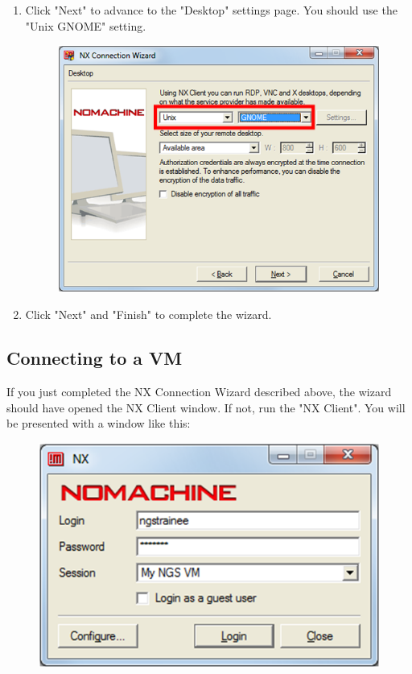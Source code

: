 \begin{enumerate}
\begin{description}
\begin{figure}[H]
    \label{fig:nx_session_configuration}
  \end{figure}
  \end{description}
  \item Click "Next" to advance to the "Desktop" settings page. You should use the
  "Unix GNOME" setting.
  \begin{figure}[H]
    \centering
    \includegraphics[scale=0.5]{post-workshop/nx_client/desktop_type.png}
    \label{fig:nx_desktop_type}
  \end{figure}
  \item Click "Next" and "Finish" to complete the wizard.
\end{enumerate}

\subsection{Connecting to a VM}
If you just completed the NX Connection Wizard described above, the wizard
should have opened the NX Client window. If not, run the "NX Client". You will
be presented with a window like this:
\begin{figure}[H]
  \centering
  \includegraphics[scale=0.5]{post-workshop/nx_client/login.png}
  \label{fig:nx_login}
\end{figure}

